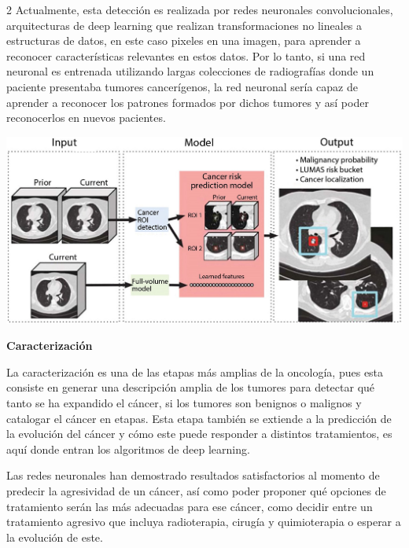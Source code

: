 \documentclass[12pt,spanish,Letterpaper,openany]{book}
\begin{document}
\begin {multicols}{2}
Actualmente, esta detección es realizada por redes neuronales convolucionales, arquitecturas de deep learning que realizan transformaciones no lineales a estructuras de datos, en este caso pixeles en una imagen, para aprender a reconocer características relevantes en estos datos. Por lo tanto, si una red neuronal es entrenada utilizando largas colecciones de radiografías donde un paciente presentaba tumores cancerígenos, la red neuronal sería capaz de aprender
a reconocer los patrones formados por dichos tumores y así poder reconocerlos en nuevos pacientes.

\begin {flushleft}
\noindent\begin{minipage}[c]{\columnwidth}

\begin{center}\includegraphics[width=1\linewidth]{imagenes_articulos/sp21_01} \end{center}

\end{minipage}
\end {flushleft}

\textbf{Caracterización}

La caracterización es una de las etapas más amplias de la oncología, pues esta consiste en generar una descripción amplia de los tumores para detectar qué tanto se ha expandido el cáncer, si los tumores son benignos o malignos y catalogar el cáncer en etapas. Esta etapa también se extiende a la predicción de la evolución del cáncer y cómo este puede responder a distintos tratamientos, es aquí donde entran los algoritmos de deep learning.

\bigskip
\bigskip
\bigskip
\bigskip

Las redes neuronales han demostrado resultados satisfactorios al momento de predecir la agresividad de un cáncer, así como poder proponer qué opciones de tratamiento serán las más adecuadas para ese cáncer, como decidir entre un tratamiento agresivo que incluya radioterapia, cirugía y quimioterapia o esperar a la evolución de este.


\end{multicols}
\end{document}
